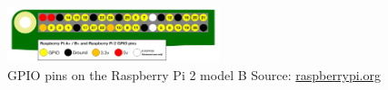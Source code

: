 
\begin{figure}[htbp]
	\centering
	\includegraphics[width=0.55\textwidth]{./figures/gpio.png}
	\caption{GPIO pins on the Raspberry Pi 2 model B {\footnotesize Source: \url{raspberrypi.org}}}
	\label{fig:gpio}
\end{figure}

